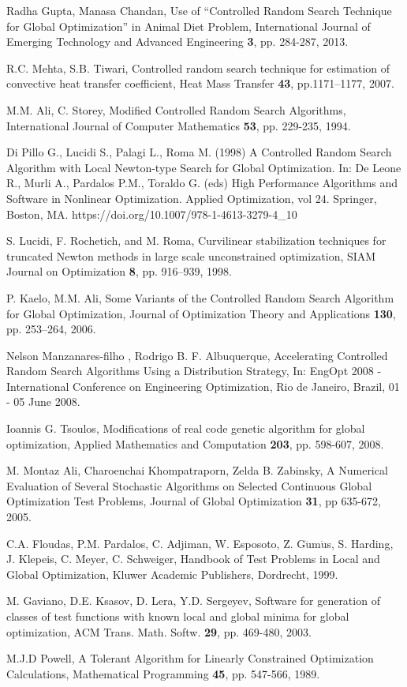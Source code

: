 \documentclass[symmetry,article,submit,moreauthors,pdftex]{Definitions/mdpi}
\begin{document}
\begin{thebibliography}{10}
Radha Gupta, Manasa Chandan, Use of \textquotedblleft Controlled
Random Search Technique for Global Optimization\textquotedblright{}
in Animal Diet Problem, International Journal of Emerging Technology
and Advanced Engineering \textbf{3}, pp. 284-287, 2013.

R.C. Mehta, S.B. Tiwari, Controlled random search
technique for estimation of convective heat transfer coefficient,
Heat Mass Transfer \textbf{43}, pp.1171--1177, 2007.

M.M. Ali, C. Storey, Modified Controlled Random
Search Algorithms, International Journal of Computer Mathematics \textbf{53},
pp. 229-235, 1994.

Di Pillo G., Lucidi S., Palagi L., Roma M. (1998)
A Controlled Random Search Algorithm with Local Newton-type Search
for Global Optimization. In: De Leone R., Murli A., Pardalos P.M.,
Toraldo G. (eds) High Performance Algorithms and Software in Nonlinear
Optimization. Applied Optimization, vol 24. Springer, Boston, MA.
https://doi.org/10.1007/978-1-4613-3279-4\_10

S. Lucidi, F. Rochetich, and M. Roma, Curvilinear
stabilization techniques for truncated Newton methods in large scale
unconstrained optimization, SIAM Journal on Optimization \textbf{8},
pp. 916--939, 1998.

P. Kaelo, M.M. Ali, Some Variants of the Controlled
Random Search Algorithm for Global Optimization, Journal of Optimization
Theory and Applications \textbf{130}, pp. 253--264, 2006.

Nelson Manzanares-filho , Rodrigo B. F. Albuquerque,
Accelerating Controlled Random Search Algorithms Using a Distribution
Strategy, In: EngOpt 2008 - International Conference on Engineering
Optimization, Rio de Janeiro, Brazil, 01 - 05 June 2008. 

Ioannis G. Tsoulos, Modifications of real code
genetic algorithm for global optimization, Applied Mathematics and
Computation \textbf{203}, pp. 598-607, 2008.

M. Montaz Ali, Charoenchai Khompatraporn, Zelda B.
Zabinsky, A Numerical Evaluation of Several Stochastic Algorithms
on Selected Continuous Global Optimization Test Problems, Journal
of Global Optimization \textbf{31}, pp 635-672, 2005. 

C.A. Floudas, P.M. Pardalos, C. Adjiman, W. Esposoto,
Z. G$\ddot{\mbox{u}}$m$\ddot{\mbox{u}}$s, S. Harding, J. Klepeis,
C. Meyer, C. Schweiger, Handbook of Test Problems in Local and Global
Optimization, Kluwer Academic Publishers, Dordrecht, 1999.

M. Gaviano, D.E. Ksasov, D. Lera, Y.D. Sergeyev, Software
for generation of classes of test functions with known local and global
minima for global optimization, ACM Trans. Math. Softw. \textbf{29},
pp. 469-480, 2003.

M.J.D Powell, A Tolerant Algorithm for Linearly Constrained
Optimization Calculations, Mathematical Programming \textbf{45}, pp.
547-566, 1989. 
\end{thebibliography}
\end{document}
